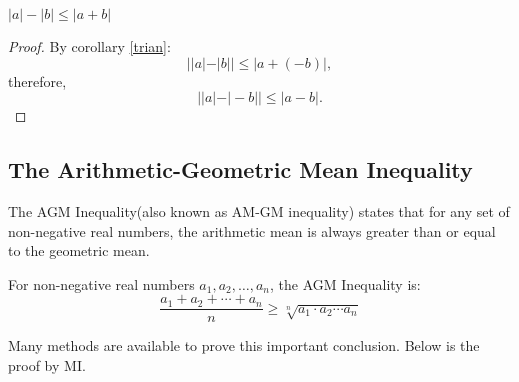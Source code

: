     \begin{corollary}
        $|a| - |b| \leq |a + b|$
        
    \end{corollary}
    \begin{proof}
        By corollary \autoref{trian}:
        \[ ||a| - |b|| \leq |a + (-b)|, \]
therefore,
\[ ||a| - |-b|| \leq |a - b|. \]
    \end{proof}
    \subsection{The Arithmetic-Geometric Mean Inequality}
    The AGM Inequality(also known as AM-GM inequality) states that for any set of non-negative real numbers, the arithmetic mean is always greater than or equal to the geometric mean.
    \begin{definition} \label{AGM}
        For non-negative real numbers \( a_1, a_2, \ldots, a_n \), the AGM Inequality is:
        \[ \frac{a_1 + a_2 + \cdots + a_n}{n} \geq \sqrt[n]{a_1 \cdot a_2 \cdots a_n} \]
    \end{definition}
    Many methods are available to prove this important conclusion. Below is the proof by MI.
